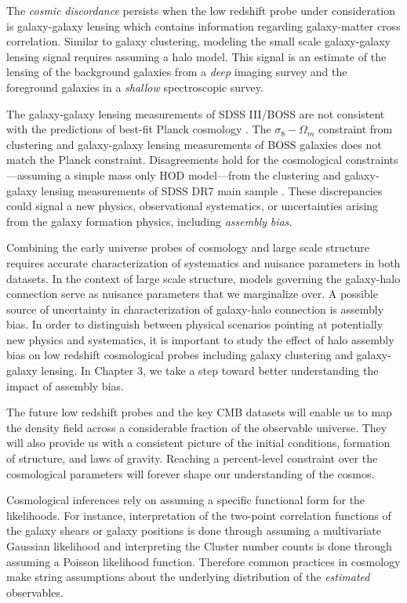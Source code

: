 The \emph{cosmic} \emph{discordance} persists when the low redshift probe under consideration is galaxy-galaxy lensing which contains information regarding galaxy-matter cross correlation. Similar to galaxy clustering, modeling the small scale galaxy-galaxy lensing signal requires assuming a halo model. 
This signal is an estimate of the lensing of the background galaxies from a \emph{deep} imaging survey and the foreground galaxies in a \emph{shallow} spectroscopic survey.

The galaxy-galaxy lensing measurements of SDSS III/BOSS \citep{miyatake15,lensingislow} are not consistent with the predictions of best-fit Planck cosmology \citep{planckII}.
The $\sigma_{8}-\Omega_{m}$ constraint from clustering and galaxy-galaxy lensing measurements of BOSS galaxies \citep{more15} does not match the Planck constraint.
Disagreements hold for the cosmological constraints---assuming a simple mass only HOD model---from the clustering and galaxy-galaxy lensing measurements of SDSS DR7 main sample \citep{cacciato13}. These discrepancies could signal a new physics, observational systematics, or uncertainties arising from the galaxy formation physics, including \emph{assembly} \emph{bias}.

Combining the early universe probes of cosmology and large scale structure requires accurate 
characterization of systematics and nuisance parameters in both datasets. In the context of large scale 
structure, models governing the galaxy-halo connection serve as nuisance parameters that we marginalize over. A possible source of uncertainty in characterization of galaxy-halo connection is assembly bias. In order to distinguish between physical scenarios pointing at potentially new physics and systematics, it is important to study the effect of halo assembly bias on low redshift cosmological probes including galaxy clustering and galaxy-galaxy lensing. In Chapter 3, we take a step toward better understanding the impact of assembly bias. 

The future low redshift probes and the key CMB datasets will enable us to map the 
density field across a considerable fraction of the observable universe. They will also provide us with 
a consistent picture of the initial conditions, formation of structure, and laws of gravity. 
Reaching a percent-level constraint over the cosmological parameters will 
forever shape our understanding of the cosmos. 

Cosmological inferences rely on assuming a specific functional form for the likelihoods. For instance, interpretation of the 
two-point correlation functions of the galaxy shears or galaxy positions is done through assuming a multivariate Gaussian likelihood 
and interpreting the Cluster number counts is done through assuming a Poisson likelihood function. Therefore common practices in 
cosmology make string assumptions about the underlying distribution of the \emph{estimated} observables.

